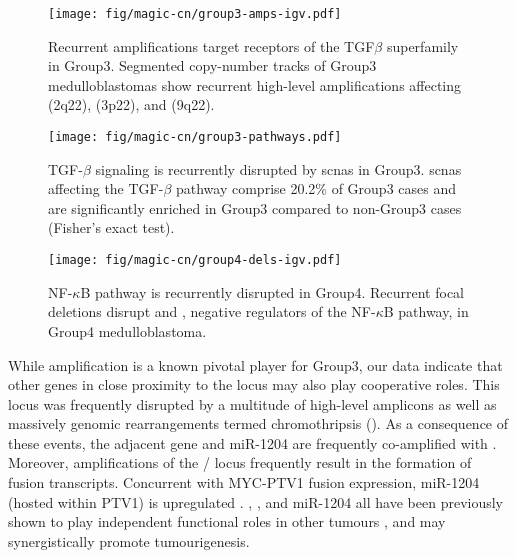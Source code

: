 \begin{SCfigure}[1][b]
	\centering
	\texttt{[image: fig/magic-cn/group3-amps-igv.pdf]}
	\caption[Recurrent amplifications target receptors of the TGF$\beta$ superfamily in Group3]
	{
		Recurrent amplifications target receptors of the TGF$\beta$ superfamily in Group3.
		Segmented copy-number tracks of Group3 medulloblastomas show recurrent high-level amplifications affecting  (2q22),  (3p22), and  (9q22).
	}
	\label{fig:group3-amps-igv}
\end{SCfigure}

\begin{SCfigure}[5][b]
	\centering
	\texttt{[image: fig/magic-cn/group3-pathways.pdf]}
	\caption[TGF-$\beta$ signaling is recurrently disrupted by \gls{scnas} in Group3]
	{
		TGF-$\beta$ signaling is recurrently disrupted by \gls{scnas} in Group3.
		\gls{scnas} affecting the TGF-$\beta$ pathway comprise 20.2\% of Group3 cases and are significantly enriched in Group3 compared to non-Group3 cases (Fisher's exact test).
	}
	\label{fig:group3-pathways}
\end{SCfigure}

\begin{SCfigure}[2]
	\centering
	\texttt{[image: fig/magic-cn/group4-dels-igv.pdf]}
	\caption[NF-$\kappa$B pathway is recurrently disrupted in Group4]
	{
	NF-$\kappa$B pathway is recurrently disrupted in Group4.
	Recurrent focal deletions disrupt  and , negative regulators of the NF-$\kappa$B pathway, in Group4 medulloblastoma.
	}
	\label{fig:group4-dels-igv}
\end{SCfigure}

While  amplification is a known pivotal player for Group3, our data indicate that other genes in close proximity to the  locus may also play cooperative roles. This locus was frequently disrupted by a multitude of high-level amplicons  as well as massively genomic rearrangements termed chromothripsis (). As a consequence of these events, the adjacent  gene and miR-1204 are frequently co-amplified with . Moreover, amplifications of the / locus frequently result in the formation of fusion transcripts. Concurrent with MYC-PTV1 fusion expression, miR-1204 (hosted within PTV1) is upregulated . , , and miR-1204 all have been previously shown to play independent functional roles in other tumours , and may synergistically promote tumourigenesis.

